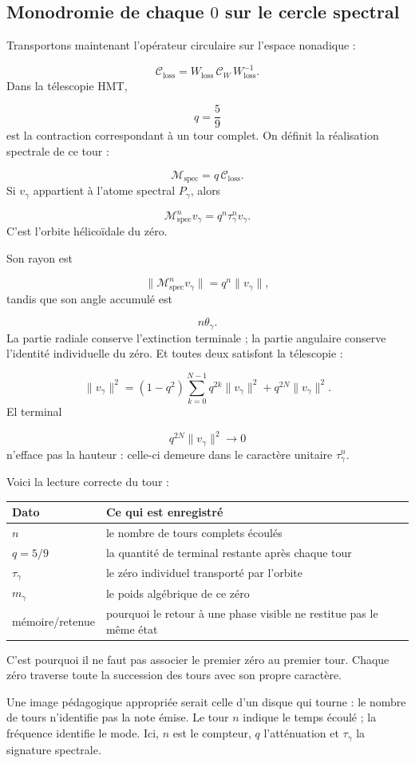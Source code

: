 \subsection{Monodromie de chaque \(0\) sur le cercle spectral}
Transportons maintenant l'opérateur circulaire sur l'espace nonadique :\par
\[
\mathcal C_{\mathrm{loss}}
=
W_{\mathrm{loss}}\,
\mathcal C_W\,
W_{\mathrm{loss}}^{-1}.
\]
Dans la télescopie HMT,\par
\[
q=\frac59
\]
est la contraction correspondant à un tour complet. On définit la réalisation spectrale de ce tour :\par
\[
\mathcal M_{\mathrm{spec}}
=
q\,\mathcal C_{\mathrm{loss}}.
\]
Si \(v_\gamma\) appartient à l'atome spectral \(P_\gamma\), alors\par
\[
\boxed{
\mathcal M_{\mathrm{spec}}^n v_\gamma
=
q^n\tau_\gamma^n v_\gamma.
}
\]
C'est l'orbite hélicoïdale du zéro.\par
Son rayon est\par
\[
\|\mathcal M_{\mathrm{spec}}^n v_\gamma\|
=
q^n\|v_\gamma\|,
\]
tandis que son angle accumulé est\par
\[
n\theta_\gamma.
\]
La partie radiale conserve l'extinction terminale ; la partie angulaire conserve l'identité individuelle du zéro. Et toutes deux satisfont la télescopie :\par
\[
\|v_\gamma\|^2
=
(1-q^2)
\sum_{k=0}^{N-1}
q^{2k}\|v_\gamma\|^2
+
q^{2N}\|v_\gamma\|^2.
\]
El terminal\par
\[
q^{2N}\|v_\gamma\|^2
\longrightarrow0
\]
n'efface pas la hauteur : celle-ci demeure dans le caractère unitaire \(\tau_\gamma^n\).\par
Voici la lecture correcte du tour :\par
{}
\begin{center}
\small
\begin{tabularx}{\textwidth}{@{}YY@{}}
\toprule
Dato & Ce qui est enregistré \\
\midrule
\(n\) & le nombre de tours complets écoulés \\
\(q=5/9\) & la quantité de terminal restante après chaque tour \\
\(\tau_\gamma\) & le zéro individuel transporté par l'orbite \\
\(m_\gamma\) & le poids algébrique de ce zéro \\
mémoire/retenue & pourquoi le retour à une phase visible ne restitue pas le même état \\
\bottomrule
\end{tabularx}
\end{center}
C'est pourquoi il ne faut pas associer le premier zéro au premier tour. Chaque zéro traverse toute la succession des tours avec son propre caractère.\par
Une image pédagogique appropriée serait celle d'un disque qui tourne : le nombre de tours n'identifie pas la note émise. Le tour \(n\) indique le temps écoulé ; la fréquence identifie le mode. Ici, \(n\) est le compteur, \(q\) l'atténuation et \(\tau_\gamma\) la signature spectrale.\par
{}
